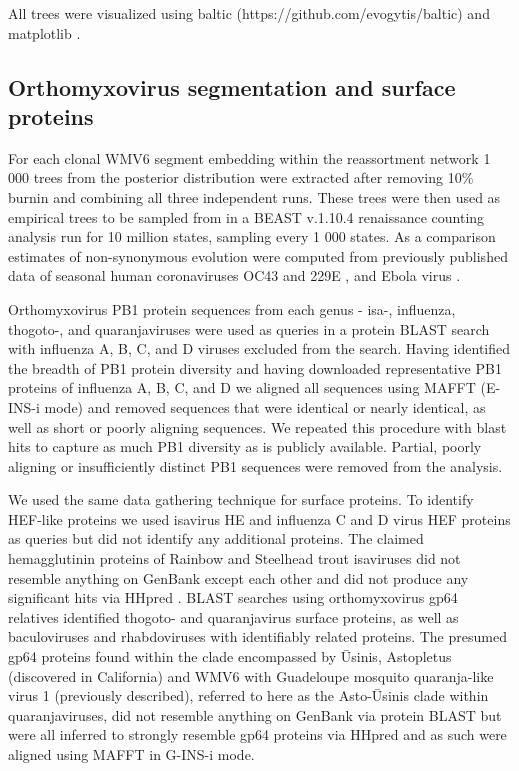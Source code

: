 \documentclass[11pt,twocolumn]{article}
\begin{document}
All trees were visualized using baltic (https://github.com/evogytis/baltic) and matplotlib \citep{hunter_matplotlib_2007}.


\subsection{Orthomyxovirus segmentation and surface proteins}

For each clonal WMV6 segment embedding within the reassortment network 1 000 trees from the posterior distribution were extracted after removing 10\% burnin and combining all three independent runs.
These trees were then used as empirical trees to be sampled from in a BEAST v.1.10.4 \citep{suchard_bayesian_2018} renaissance counting analysis \citep{lemey_counting_2012} run for 10 million states, sampling every 1 000 states.
As a comparison estimates of non-synonymous evolution were computed from previously published data of seasonal human coronaviruses OC43 and 229E \citep{kistler_evidence_2021}, and Ebola virus \citep{park_ebola_2015}.

Orthomyxovirus PB1 protein sequences from each genus - isa-, influenza, thogoto-, and quaranjaviruses were used as queries in a protein BLAST \citep{altschul_basic_1990} search with influenza A, B, C, and D viruses excluded from the search.
Having identified the breadth of PB1 protein diversity and having downloaded representative PB1 proteins of influenza A, B, C, and D we aligned all sequences using MAFFT \citep{katoh_mafft_2005} (E-INS-i mode) and removed sequences that were identical or nearly identical, as well as short or poorly aligning sequences.
We repeated this procedure with blast hits to capture as much PB1 diversity as is publicly available.
Partial, poorly aligning or insufficiently distinct PB1 sequences were removed from the analysis.

We used the same data gathering technique for surface proteins.
To identify HEF-like proteins we used isavirus HE and influenza C and D virus HEF proteins as queries but did not identify any additional proteins.
The claimed hemagglutinin proteins of Rainbow and Steelhead trout isaviruses did not resemble anything on GenBank except each other and did not produce any significant hits via HHpred \citep{finn_hmmer_2011}.
BLAST searches using orthomyxovirus gp64 relatives identified thogoto- and quaranjavirus surface proteins, as well as baculoviruses and rhabdoviruses with identifiably related proteins.
The presumed gp64 proteins found within the clade encompassed by \={U}sinis, Astopletus (discovered in California) and WMV6 with Guadeloupe mosquito quaranja-like virus 1 (previously described), referred to here as the Asto-\={U}sinis clade within quaranjaviruses, did not resemble anything on GenBank via protein BLAST but were all inferred to strongly resemble gp64 proteins via HHpred and as such were aligned using MAFFT in G-INS-i mode.
\end{document}
